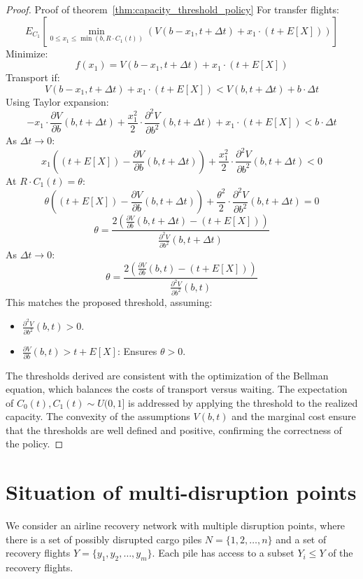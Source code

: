 \documentclass[opre,sglanonrev]{informs4}
\begin{document}
\begin{proof}{Proof of theorem~\ref{thm:capacity_threshold_policy}}
For transfer flights:
\[
E_{C_1} \left[ \min_{0 \leq x_1 \leq \min(b, R \cdot C_1(t))} \left( V(b - x_1, t + \Delta t) + x_1 \cdot (t + E[X]) \right) \right]
\]
Minimize:
\[
f(x_1) = V(b - x_1, t + \Delta t) + x_1 \cdot (t + E[X])
\]
Transport if:
\[
V(b - x_1, t + \Delta t) + x_1 \cdot (t + E[X]) < V(b, t + \Delta t) + b \cdot \Delta t
\]
Using Taylor expansion:
\[
-x_1 \cdot \frac{\partial V}{\partial b}(b, t + \Delta t) + \frac{x_1^2}{2} \cdot \frac{\partial^2 V}{\partial b^2}(b, t + \Delta t) + x_1 \cdot (t + E[X]) < b \cdot \Delta t
\]
As \( \Delta t \to 0 \):
\[
x_1 \left( (t + E[X]) - \frac{\partial V}{\partial b}(b, t + \Delta t) \right) + \frac{x_1^2}{2} \cdot \frac{\partial^2 V}{\partial b^2}(b, t + \Delta t) < 0
\]
At \( R \cdot C_1(t) = \theta \):
\[
\theta \left( (t + E[X]) - \frac{\partial V}{\partial b}(b, t + \Delta t) \right) + \frac{\theta^2}{2} \cdot \frac{\partial^2 V}{\partial b^2}(b, t + \Delta t) = 0
\]
\[
\theta = \frac{2 \left( \frac{\partial V}{\partial b}(b, t + \Delta t) - (t + E[X]) \right)}{\frac{\partial^2 V}{\partial b^2}(b, t + \Delta t)}
\]
As \( \Delta t \to 0 \):
\[
\theta = \frac{2 \left( \frac{\partial V}{\partial b}(b, t) - (t + E[X]) \right)}{\frac{\partial^2 V}{\partial b^2}(b, t)}
\]
This matches the proposed threshold, assuming:
\begin{itemize}
    \item \( \frac{\partial^2 V}{\partial b^2}(b, t) > 0 \).
    \item \( \frac{\partial V}{\partial b}(b, t) > t + E[X] \): Ensures \( \theta > 0 \).
\end{itemize}

The thresholds derived are consistent with the optimization of the Bellman equation, which balances the costs of transport versus waiting. The expectation of \( C_0(t), C_1(t) \sim U(0,1] \) is addressed by applying the threshold to the realized capacity. The convexity of the assumptions \( V(b, t) \) and the marginal cost ensure that the thresholds are well defined and positive, confirming the correctness of the policy.

\end{proof}

\section{Situation of multi-disruption points}
We consider an airline recovery network with multiple disruption points, where there is a set of possibly disrupted cargo %
piles \( N = \{1, 2, \dots, n\} \) and a set of recovery flights \( Y = \{y_1, y_2, \dots, y_m\} \). Each pile has access to %
a subset \( Y_i \leq Y \) of the recovery flights.
\end{document}
